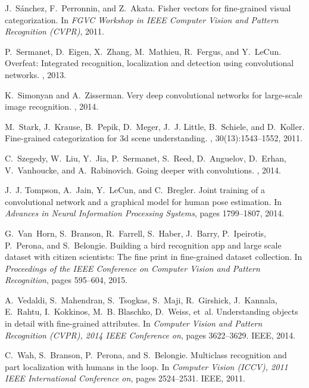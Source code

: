\documentclass[10pt,twocolumn,letterpaper]{article}
\begin{document}
\begin{thebibliography}{10}
J.~S{\'a}nchez, F.~Perronnin, and Z.~Akata.
\newblock Fisher vectors for fine-grained visual categorization.
\newblock In {\em FGVC Workshop in IEEE Computer Vision and Pattern Recognition
  (CVPR)}, 2011.

P.~Sermanet, D.~Eigen, X.~Zhang, M.~Mathieu, R.~Fergus, and Y.~LeCun.
\newblock Overfeat: Integrated recognition, localization and detection using
  convolutional networks.
, 2013.

K.~Simonyan and A.~Zisserman.
\newblock Very deep convolutional networks for large-scale image recognition.
, 2014.

M.~Stark, J.~Krause, B.~Pepik, D.~Meger, J.~J. Little, B.~Schiele, and
  D.~Koller.
\newblock Fine-grained categorization for 3d scene understanding.
, 30(13):1543--1552,
  2011.

C.~Szegedy, W.~Liu, Y.~Jia, P.~Sermanet, S.~Reed, D.~Anguelov, D.~Erhan,
  V.~Vanhoucke, and A.~Rabinovich.
\newblock Going deeper with convolutions.
, 2014.

J.~J. Tompson, A.~Jain, Y.~LeCun, and C.~Bregler.
\newblock Joint training of a convolutional network and a graphical model for
  human pose estimation.
\newblock In {\em Advances in Neural Information Processing Systems}, pages
  1799--1807, 2014.

G.~Van~Horn, S.~Branson, R.~Farrell, S.~Haber, J.~Barry, P.~Ipeirotis,
  P.~Perona, and S.~Belongie.
\newblock Building a bird recognition app and large scale dataset with citizen
  scientists: The fine print in fine-grained dataset collection.
\newblock In {\em Proceedings of the IEEE Conference on Computer Vision and
  Pattern Recognition}, pages 595--604, 2015.

A.~Vedaldi, S.~Mahendran, S.~Tsogkas, S.~Maji, R.~Girshick, J.~Kannala,
  E.~Rahtu, I.~Kokkinos, M.~B. Blaschko, D.~Weiss, et~al.
\newblock Understanding objects in detail with fine-grained attributes.
\newblock In {\em Computer Vision and Pattern Recognition (CVPR), 2014 IEEE
  Conference on}, pages 3622--3629. IEEE, 2014.

C.~Wah, S.~Branson, P.~Perona, and S.~Belongie.
\newblock Multiclass recognition and part localization with humans in the loop.
\newblock In {\em Computer Vision (ICCV), 2011 IEEE International Conference
  on}, pages 2524--2531. IEEE, 2011.


\end{thebibliography}
\end{document}
